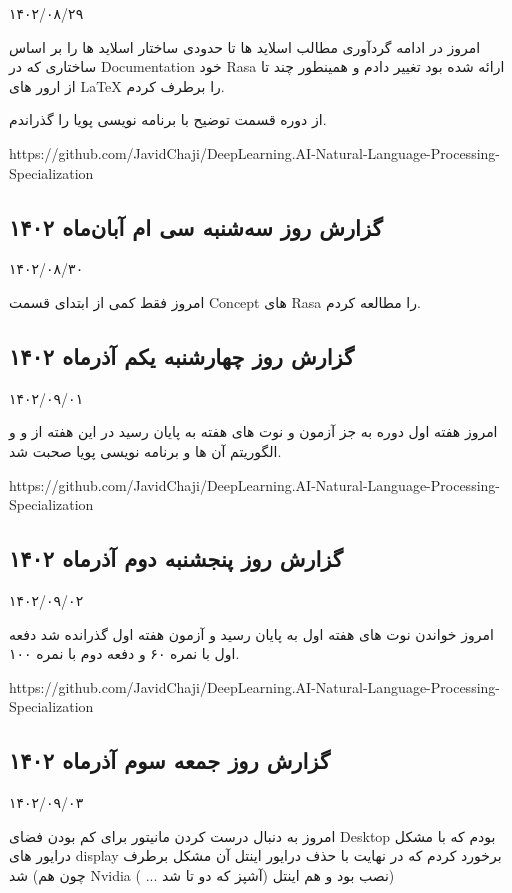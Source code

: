 ۱۴۰۲/۰۸/۲۹

امروز در ادامه گردآوری مطالب اسلاید ها تا حدودی ساختار اسلاید ها را بر اساس ساختاری که در Documentation خود Rasa ارائه شده بود تغییر دادم و همینطور چند تا از ارور های LaTeX را برطرف کردم.

از دوره  قسمت توضیح  با برنامه نویسی پویا را گذراندم.

https://github.com/JavidChaji/DeepLearning.AI-Natural-Language-Processing-Specialization


\subsection{گزارش روز سه‌شنبه سی ام آبان‌ماه ۱۴۰۲}

۱۴۰۲/۰۸/۳۰

امروز فقط کمی از ابتدای قسمت Concept های Rasa را مطالعه کردم.


\subsection{گزارش روز چهارشنبه یکم آذر‌ماه ۱۴۰۲}

۱۴۰۲/۰۹/۰۱

امروز هفته اول دوره  به جز آزمون و نوت های هفته به پایان رسید در این هفته از  و  و الگوریتم آن ها و برنامه نویسی پویا صحبت شد.

https://github.com/JavidChaji/DeepLearning.AI-Natural-Language-Processing-Specialization


\subsection{گزارش روز پنجشنبه دوم آذر‌ماه ۱۴۰۲}

۱۴۰۲/۰۹/۰۲

امروز خواندن نوت های هفته اول به پایان رسید و آزمون هفته اول گذرانده شد دفعه اول با نمره ۶۰ و دفعه دوم با نمره ۱۰۰.

https://github.com/JavidChaji/DeepLearning.AI-Natural-Language-Processing-Specialization


\subsection{گزارش روز جمعه سوم آذرماه ۱۴۰۲}

۱۴۰۲/۰۹/۰۳

امروز به دنبال درست کردن مانیتور برای کم بودن فضای Desktop بودم که با مشکل درایور های display  برخورد کردم که در نهایت با حذف درایور اینتل آن مشکل برطرف شد (چون هم Nvidia نصب بود و هم اینتل (آشپز که دو تا شد ... ))


